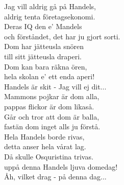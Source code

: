 \documentclass[a6paper,10pt]{article}
\begin{document}
\setlength{\oddsidemargin}{-0.47in}
\noindent
\begin{center}
\end{center}
Jag vill aldrig gå på Handels,\\
aldrig tenta företagsekonomi.\\
Deras IQ den e' Mandels\\
och förståndet, det har ju gjort sorti.\\
Dom har jätteusla snören\\
till sitt jätteusla draperi.\\
Dom kan bara räkna ören,\\
hela skolan e' ett enda aperi!
\vspace{5pt}\\
Handels är skit - Jag vill ej dit...
\vspace{5pt}\\
Mammons pojkar är dom alla,\\
pappas flickor är dom likaså.\\
Går och tror att dom är balla,\\
fastän dom inget alls ju förstå.\\
Hela Handels borde rivas,\\
detta anser hela vårat lag.\\
Då skulle Osquristina trivas.\\
uppå denna Handels ljuva domedag!
\vspace{5pt}\\
Åh, vilket drag - på denna dag... 
\end{document}
